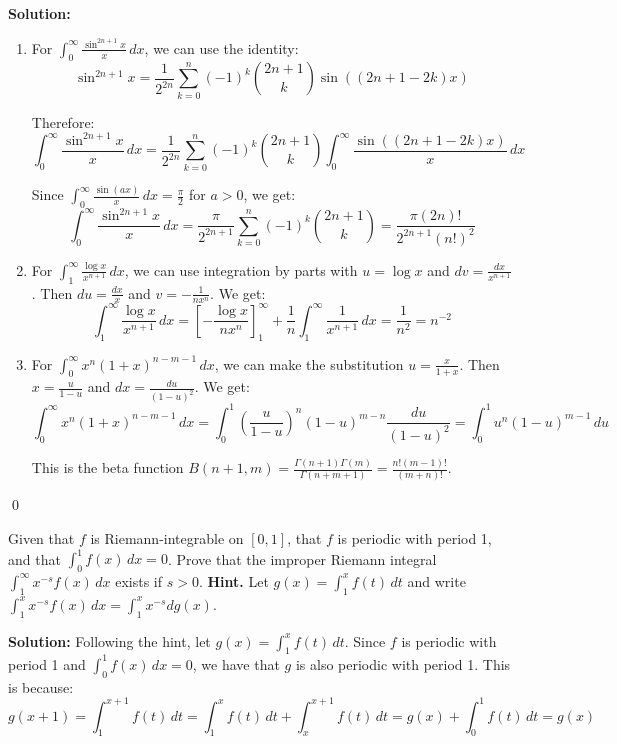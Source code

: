 \bigskip\noindent\textbf{Solution:}
\begin{enumerate}[label=(\alph*)]
    \item For $\int_{0}^{\infty} \frac{\sin^{2n+1} x}{x} \, dx$, we can use the identity:
    \[\sin^{2n+1} x = \frac{1}{2^{2n}} \sum_{k=0}^{n} (-1)^k \binom{2n+1}{k} \sin((2n+1-2k)x)\]
    
    Therefore:
    \[\int_{0}^{\infty} \frac{\sin^{2n+1} x}{x} \, dx = \frac{1}{2^{2n}} \sum_{k=0}^{n} (-1)^k \binom{2n+1}{k} \int_{0}^{\infty} \frac{\sin((2n+1-2k)x)}{x} \, dx\]
    
    Since $\int_{0}^{\infty} \frac{\sin(ax)}{x} \, dx = \frac{\pi}{2}$ for $a > 0$, we get:
    \[\int_{0}^{\infty} \frac{\sin^{2n+1} x}{x} \, dx = \frac{\pi}{2^{2n+1}} \sum_{k=0}^{n} (-1)^k \binom{2n+1}{k} = \frac{\pi(2n)!}{2^{2n+1}(n!)^2}\]
    
    \item For $\int_{1}^{\infty} \frac{\log x}{x^{n+1}} \, dx$, we can use integration by parts with $u = \log x$ and $dv = \frac{dx}{x^{n+1}}$. Then $du = \frac{dx}{x}$ and $v = -\frac{1}{nx^n}$. We get:
    \[\int_{1}^{\infty} \frac{\log x}{x^{n+1}} \, dx = \left[-\frac{\log x}{nx^n}\right]_{1}^{\infty} + \frac{1}{n} \int_{1}^{\infty} \frac{1}{x^{n+1}} \, dx = \frac{1}{n^2} = n^{-2}\]
    
    \item For $\int_{0}^{\infty} x^n (1 + x)^{n-m-1} \, dx$, we can make the substitution $u = \frac{x}{1+x}$. Then $x = \frac{u}{1-u}$ and $dx = \frac{du}{(1-u)^2}$. We get:
    \[\int_{0}^{\infty} x^n (1 + x)^{n-m-1} \, dx = \int_{0}^{1} \left(\frac{u}{1-u}\right)^n (1-u)^{m-n} \frac{du}{(1-u)^2} = \int_{0}^{1} u^n (1-u)^{m-1} \, du\]
    
    This is the beta function $B(n+1, m) = \frac{\Gamma(n+1)\Gamma(m)}{\Gamma(n+m+1)} = \frac{n!(m-1)!}{(m+n)!}$.
\end{enumerate}\qed


\begin{problembox}
Given that $f$ is Riemann-integrable on $[0, 1]$, that $f$ is periodic with period 1, and that $\int_{0}^{1} f(x) \, dx = 0$. Prove that the improper Riemann integral $\int_{1}^{\infty} x^{-s} f(x) \, dx$ exists if $s > 0$. \textbf{Hint.} Let $g(x) = \int_{1}^{x} f(t) \, dt$ and write $\int_{1}^{x} x^{-s} f(x) \, dx = \int_{1}^{x} x^{-s} dg(x)$.
\end{problembox}

\bigskip\noindent\textbf{Solution:}
Following the hint, let $g(x) = \int_{1}^{x} f(t) \, dt$. Since $f$ is periodic with period 1 and $\int_{0}^{1} f(x) \, dx = 0$, we have that $g$ is also periodic with period 1. This is because:
\[g(x+1) = \int_{1}^{x+1} f(t) \, dt = \int_{1}^{x} f(t) \, dt + \int_{x}^{x+1} f(t) \, dt = g(x) + \int_{0}^{1} f(t) \, dt = g(x)\]

